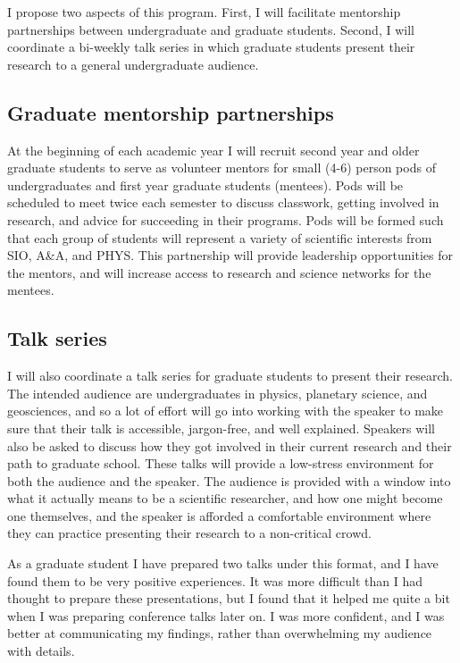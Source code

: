 \documentclass[12pt]{article}
\begin{document}
I propose two aspects of this program. First, I will facilitate mentorship partnerships between undergraduate and graduate students. Second, I will coordinate a bi-weekly talk series in which graduate students present their research to a general undergraduate audience. 

\subsection{Graduate mentorship partnerships}
At the beginning of each academic year I will recruit second year and older graduate students to serve as volunteer mentors for small (4-6) person pods of undergraduates and first year graduate students (mentees). Pods will be scheduled to meet twice each semester to discuss classwork, getting involved in research, and advice for succeeding in their programs. 
Pods will be formed such that each group of students will represent a variety of scientific interests from SIO, A\&A, and PHYS. 
This partnership will provide leadership opportunities for the mentors, and will increase access to research and science networks for the mentees.
\subsection{Talk series}
I will also coordinate a talk series for graduate students to present their research. The intended audience are undergraduates in physics, planetary science, and geosciences, and so a lot of effort will go into working with the speaker to make sure that their talk is accessible, jargon-free, and well explained. Speakers will also be asked to discuss how they got involved in their current research and their path to graduate school. These talks will provide a low-stress environment for both the audience and the speaker.
The audience is provided with a window into what it actually means to be a scientific researcher, and how one might become one themselves, and the speaker is afforded a comfortable environment where they can practice presenting their research to a non-critical crowd.

As a graduate student I have prepared two talks under this format, and I have found them to be very positive experiences. It was more difficult than I had thought to prepare these presentations, but I found that it helped me quite a bit when I was preparing conference talks later on. I was more confident, and I was better at communicating my findings, rather than overwhelming my audience with details. 
\end{document}
